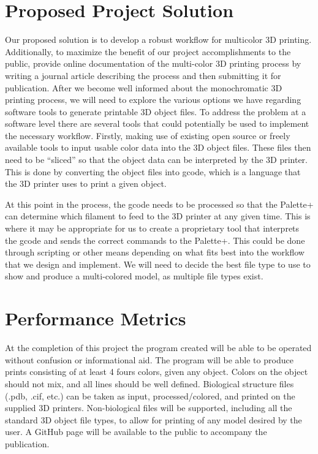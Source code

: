 \documentclass[letterpaper, onecolumn, draftclsnofoot, 10pt, compsoc]{IEEEtran}
\begin{document}
\section{Proposed Project Solution}
    \begin{singlespace}
        Our proposed solution is to develop a robust workflow for multicolor 3D printing. Additionally, to maximize the benefit of our project accomplishments to the public, provide online documentation of the multi-color 3D printing process by writing a journal article describing the process and then submitting it for publication. After we become well informed about the monochromatic 3D printing process, we will need to explore the various options we have regarding software tools to generate printable 3D object files. To address the problem at a software level there are several tools that could potentially be used to implement the necessary workflow. Firstly, making use of existing open source or freely available tools to input usable color data into the 3D object files. These files then need to be “sliced” so that the object data can be interpreted by the 3D printer. This is done by converting the object files into gcode, which is a language that the 3D printer uses to print a given object.\par
        At this point in the process, the gcode needs to be processed so that the Palette+ can determine which filament to feed to the 3D printer at any given time. This is where it may be appropriate for us to create a proprietary tool that interprets the gcode and sends the correct commands to the Palette+. This could be done through scripting or other means depending on what fits best into the workflow that we design and implement. We will need to decide the best file type to use to show and produce a multi-colored model, as multiple file types exist.\par
    \end{singlespace}
    
\section{Performance Metrics}
    \begin{singlespace}
        At the completion of this project the program created will be able to be operated without confusion or informational aid.
        The program will be able to produce prints consisting of at least 4 fours colors, given any object.
        Colors on the object should not mix, and all lines should be well defined.
        Biological structure files (.pdb, .cif, etc.) can be taken as input, processed/colored, and printed on the supplied 3D printers.
        Non-biological files will be supported, including all the standard 3D object file types, to allow for printing of any model desired by the user. A GitHub page will be available to the public to accompany the publication.\par
    \end{singlespace}
\end{document}
